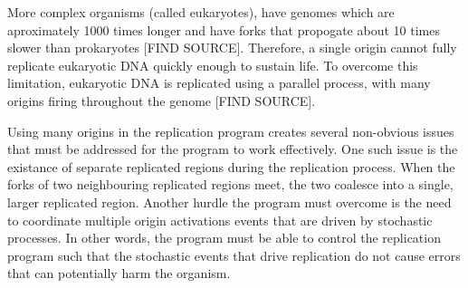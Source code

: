\documentclass[serif]{sfuthesis}
\begin{document}
More complex organisms (called eukaryotes), have genomes which are aproximately 1000 times longer and have forks that propogate about 10 times slower than prokaryotes [FIND SOURCE].
Therefore, a single origin cannot fully replicate eukaryotic DNA quickly enough to sustain life.
To overcome this limitation, eukaryotic DNA is replicated using a parallel process, with many origins firing throughout the genome [FIND SOURCE].

Using many origins in the replication program creates several non-obvious issues that must be addressed for the program to work effectively.
One such issue is the existance of separate replicated regions during the replication process.
When the forks of two neighbouring replicated regions meet, the two coalesce into a single, larger replicated region.
Another hurdle the program must overcome is the need to coordinate multiple origin activations events that are driven by stochastic processes.
In other words, the program must be able to control the replication program such that the stochastic events that drive replication do not cause errors that can potentially harm the organism.\cite{eukaryotereview}



\end{document}
